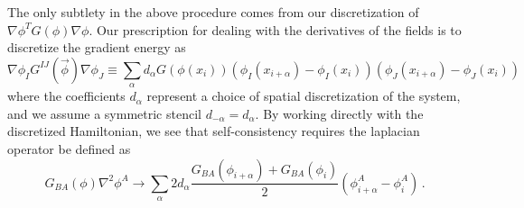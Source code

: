 \documentclass[a4paper,11pt]{article}
\begin{document}
The only subtlety in the above procedure comes from our discretization of  $\nabla\phi^TG(\phi)\nabla\phi$.
Our prescription for dealing with the derivatives of the fields is to discretize the gradient energy as
\begin{equation}
  \nabla\phi_IG^{IJ}(\vec{\phi})\nabla\phi_J \equiv \sum_{\alpha} d_{\alpha}G(\phi(x_i))(\phi_I(x_{i+\alpha})-\phi_I(x_i))(\phi_J(x_{i+\alpha})-\phi_J(x_i))
\end{equation}
where the coefficients $d_\alpha$ represent a choice of spatial discretization of the system, and we assume a symmetric stencil $d_{-\alpha}=d_\alpha$.
By working directly with the discretized Hamiltonian, we see that self-consistency requires the laplacian operator be defined as
\begin{equation}
  G_{BA}(\phi)\nabla^2\phi^A \to \sum_{\alpha}2d_\alpha \frac{G_{BA}(\phi_{i+\alpha})+G_{BA}(\phi_i)}{2}\left(\phi^A_{i+\alpha}-\phi^A_i\right) \, .
\end{equation}
\end{document}
